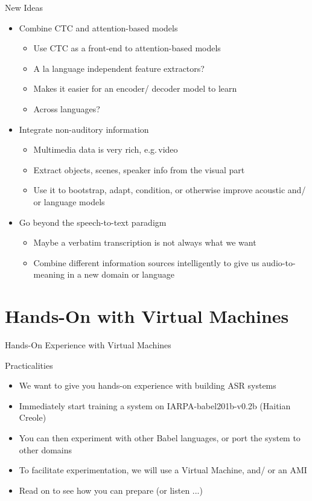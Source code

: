 \begin{frame}{New Ideas}
  \begin{itemize}
  \item Combine CTC and attention-based models
    \begin{itemize}
    \item Use CTC as a front-end to attention-based models
    \item A la language independent feature extractors?
    \item Makes it easier for an encoder/ decoder model to learn
    \item Across languages?
    \end{itemize}
  \item Integrate non-auditory information
    \begin{itemize}
    \item Multimedia data is very rich, e.g.\,video
    \item Extract objects, scenes, speaker info from the visual part
    \item Use it to bootstrap, adapt, condition, or otherwise improve acoustic and/ or language models
    \end{itemize}
  \item Go beyond the speech-to-text paradigm
    \begin{itemize}
    \item Maybe a verbatim transcription is not always what we want
    \item Combine different information sources intelligently to give us audio-to-meaning in a new domain or language
    \end{itemize}
  \end{itemize}
\end{frame}


\section{Hands-On with Virtual Machines}

\begin{frame}
  \begin{center}
    {\color{Maroon}\Huge Hands-On Experience with Virtual Machines\par}
  \end{center}
\end{frame}

\begin{frame}{Practicalities}
  \begin{itemize}
  \item We want to give you hands-on experience with building ASR systems
  \item Immediately start training a system on IARPA-babel201b-v0.2b (Haitian Creole)
  \item You can then experiment with other Babel languages, or port the system to other domains
  \item To facilitate experimentation, we will use a Virtual Machine, and/ or an AMI
  \item {\color{Maroon}Read on to see how you can prepare (or listen ...)}
  \end{itemize}
\end{frame}

